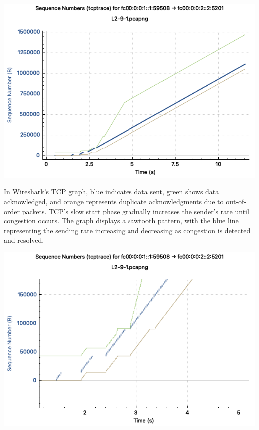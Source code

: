 \includegraphics{Lab2/traces/tcptrace.png}

In Wireshark's TCP graph, blue indicates data sent, green shows data acknowledged, and orange represents duplicate acknowledgments due to out-of-order packets.
TCP's slow start phase gradually increases the sender's rate until congestion occurs. The graph displays a sawtooth pattern, with the blue line representing the sending rate increasing and decreasing as congestion is detected and resolved.

\includegraphics{Lab2/traces/exponenential.png}